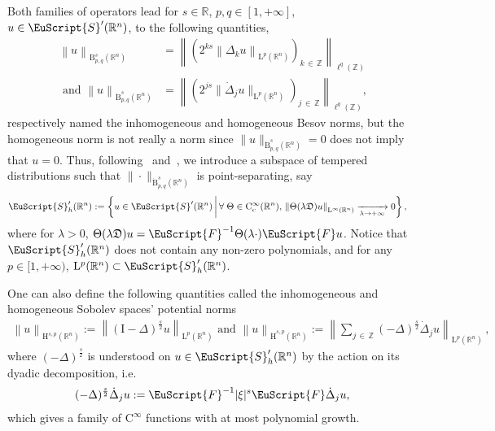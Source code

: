 \documentclass[10pt]{amsart}
\theoremstyle{definition}\newtheorem{defi}[theo]{Definition}\newtheorem{rema}[theo]{Remark}\newtheorem{exam}[theo]{Example}\newtheorem{exem}[theo]{Example}\newtheorem{nota}[theo]{Notation}
\newcommand{\bbR}{\mathbb{R}}
\newcommand{\bbZ}{\mathbb{Z}}
\newcommand{\rmH}{\mathrm{H}}%
\newcommand{\rmB}{\mathrm{B}}
\newcommand{\rmL}{\mathrm{L}}
\newcommand{\rmC}{\mathrm{C}}
\newcommand{\rmI}{\mathrm{I}}
\newcommand{\fkD}{\mathfrak{D}}
\newcommand{\eus}{\EuScript}
\let\oldforall\forall
\renewcommand*{\forall}{\mathrel{\oldforall}}
\begin{document}
Both families of operators lead for $s\in\bbR$, $p,q\in[1,+\infty]$, $u\in \eus{S}'(\bbR^n)$, to the following quantities,
\begin{align*}
\left\| u \right\|_{\rmB^{s}_{p,q}(\bbR^n)} &= \left\|\left(2^{ks}\left\| {\Delta}_k u \right\|_{\rmL^{p}(\bbR^n)}\right)_{k\,\in\,\bbZ}\right\|_{\ell^{q}(\bbZ)}\\
\text{ and }
\left\| u \right\|_{\dot{\rmB}^{s}_{p,q}(\bbR^n)} &= \left\|\left(2^{js}\| \dot{\Delta}_j u \|_{\rmL^{p}(\bbR^n)}\right)_{j\,\in\,\bbZ}\right\|_{\ell^{q}(\bbZ)}\text{,}
\end{align*}
respectively named the inhomogeneous and homogeneous Besov norms, but the homogeneous norm is not really a norm since $\| u \|_{\dot{\rmB}^{s}_{p,q}(\bbR^n)}=0$ does not imply that $u=0$. Thus, following~\cite[Chapter~2]{bookBahouriCheminDanchin} and~\cite[Chapter~3]{DanchinHieberMuchaTolk2020}, we introduce a subspace of tempered distributions such that $\| \cdot \|_{\dot{\rmB}^{s}_{p,q}(\bbR^n)}$ is point-separating, say
\begin{align*}
\eus{S}'_h(\bbR^n) &:= \left\{ u\in \eus{S}'(\bbR^n)\,\middle|\,\forall \Theta \in \rmC _c^\infty(\bbR^n),\, \left\| \Theta(\lambda \fkD) u \right\|_{\rmL^\infty(\bbR^n)} \xrightarrow[\lambda\rightarrow+\infty]{} 0\right\}\text{,}
\end{align*}
where for $\lambda>0$, $\Theta(\lambda \fkD )u = \eus{F}^{-1}{\Theta}(\lambda\cdot)\eus{F}u$. Notice that $\eus{S}'_h(\bbR^n)$ does not contain any non-zero polynomials, and for any $p\in[1,+\infty)$, $\rmL^p(\bbR^n)\subset\eus{S}'_h(\bbR^n)$.


One can also define the following quantities called the inhomogeneous and homogeneous Sobolev spaces' potential norms
\begin{align*}
\left\| {u} \right\|_{\rmH^{s,p}(\bbR^n)}:= \left\|{(\rmI -\Delta)^\frac{s}{2} u} \right\|_{\rmL^{p}(\bbR^n)}\text{ and } \left\| {u} \right\|_{\dot{\rmH}^{s,p}(\bbR^n)}:= \left\| \sum_{j\,\in\,\bbZ} (-\Delta)^\frac{s}{2}\dot{\Delta}_{j} u \right\|_{{\rmL}^{p}(\bbR^n)}\,,
\end{align*}
where $(-\Delta)^\frac{s}{2}$ is understood on $u\in \eus{S}'_h(\bbR^n)$ by the action on its dyadic decomposition, i.e.
\begin{align*}
(-\Delta)^\frac{s}{2}\dot{\Delta}_j u:= \eus{F}^{-1}|\xi|^s\eus{F}\dot{\Delta}_j u\text{,}
\end{align*}
which gives a family of $\rmC ^\infty$ functions with at most polynomial growth.
\end{document}
